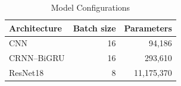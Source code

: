 \begin{table}[t]
  \caption{Model Configurations}
  \label{tab:model-parameters}
  \centering
  \begin{tabular}{lrr}
    \toprule
    Architecture & Batch size & Parameters \\
    \midrule
    CNN & 16 & 94,186 \\
    CRNN--BiGRU & 16 & 293,610 \\
    ResNet18 & 8 & 11,175,370 \\
    \bottomrule
  \end{tabular}
\end{table}
